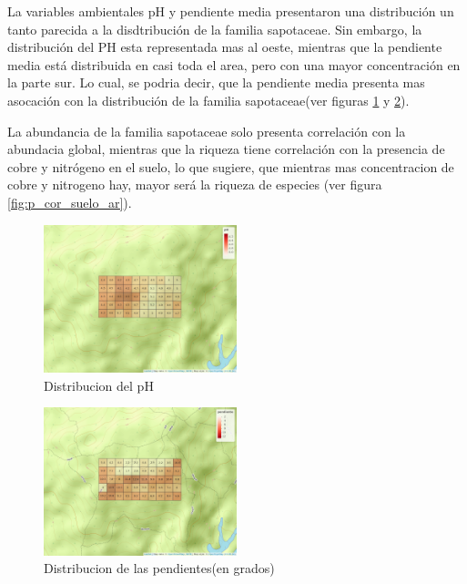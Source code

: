 \documentclass[11pt,]{article}
\begin{document}
La variables ambientales pH y pendiente media presentaron una
distribución un tanto parecida a la disdtribución de la familia
sapotaceae. Sin embargo, la distribución del PH esta representada mas al
oeste, mientras que la pendiente media está distribuida en casi toda el
area, pero con una mayor concentración en la parte sur. Lo cual, se
podria decir, que la pendiente media presenta mas asocación con la
distribución de la familia sapotaceae(ver figuras
\ref{fig:mapa_cuadros_pH} y \ref{fig:mapa_cuadros_pendiente}).

La abundancia de la familia sapotaceae solo presenta correlación con la
abundacia global, mientras que la riqueza tiene correlación con la
presencia de cobre y nitrógeno en el suelo, lo que sugiere, que mientras
mas concentracion de cobre y nitrogeno hay, mayor será la riqueza de
especies (ver figura \ref{fig:p_cor_suelo_ar}).

\begin{figure}
\centering
\includegraphics[width=0.50000\textwidth]{mapa_cuadros_ph.png}
\caption{Distribucion del pH\label{fig:mapa_cuadros_pH}}
\end{figure}

\begin{figure}
\centering
\includegraphics[width=0.50000\textwidth]{mapa_cuadros_pendiente.png}
\caption{Distribucion de las pendientes(en
grados)\label{fig:mapa_cuadros_pendiente}}
\end{figure}
\end{document}
